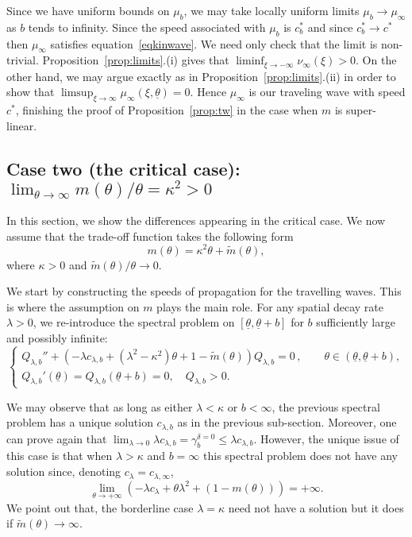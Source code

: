 \documentclass[11pt]{article}    %
\begin{document}
Since we have uniform bounds on $\mu_b$, we may take locally uniform limits $\mu_b \to \mu_\infty$ as $b$ tends to infinity.  Since the speed associated with $\mu_b$ is $c_b^*$ and since $c_b^* \to c^*$ then $\mu_\infty$ satisfies equation~\eqref{eqkinwave}.  We need only check that the limit is non-trivial.  Proposition~\ref{prop:limits}.(i) gives that $\liminf_{\xi\to-\infty} \nu_\infty(\xi) > 0$.  On the other hand, we may argue exactly as in Proposition~\ref{prop:limits}.(ii) in order to show that $\limsup_{\xi\to\infty} \mu_\infty(\xi,\underline\theta) = 0$.  Hence $\mu_\infty$ is our traveling wave with speed $c^*$, finishing the proof of Proposition~\ref{prop:tw} in the case when $m$ is super-linear.


\subsection{Case two (the critical case): $\lim_{\theta\to\infty} m(\theta)/\theta = \kappa^2 > 0$}

In this section, we show the differences appearing in the critical case. We now assume that the trade-off function takes the following form
\begin{equation*}
m(\theta) = \kappa^2 \theta + \widetilde m(\theta), 
\end{equation*}
where $\kappa > 0$ and $\widetilde m(\theta)/\theta \to 0$.

We start by constructing the speeds of propagation for the travelling waves. This is where the assumption on $m$ plays the main role. For any spatial decay rate $\lambda > 0$, we re-introduce the spectral problem on $[\underline\theta, \underline\theta + b]$ for $b$ sufficiently large and possibly infinite:
\begin{equation*}
\begin{cases} 
Q_{\lambda,b}''+ \left( - \lambda c_{\lambda,b} + \left( \lambda^2 - \kappa^2 \right) \theta  + 1 - \widetilde m(\theta)  \right) Q_{\lambda,b} = 0\,, \qquad \theta \in (\underline\theta, \underline\theta + b), \\
 Q_{\lambda,b} ' \left( \underline\theta \right)= Q_{\lambda,b}(\underline\theta + b) = 0, \quad Q_{\lambda,b} > 0.
\end{cases}
\end{equation*}

We may observe that as long as either $\lambda < \kappa$ or $b < \infty$, the previous spectral problem has a unique solution $c_{\lambda,b}$ as in the previous sub-section. Moreover, one can prove again that $\lim_{\lambda \to 0} \lambda c_{\lambda,b} = \gamma_b^{\delta=0} \leq \lambda c_{\lambda,b}$.  However, the unique issue of this case is that when $\lambda > \kappa$ and $b = \infty$ this spectral problem does not have any solution since, denoting $c_\lambda = c_{\lambda,\infty}$,
\begin{equation*}
\lim_{\theta \to + \infty} \left( - \lambda c_\lambda + \theta \lambda^2   + \left( 1 - m(\theta) \right) \right) = + \infty.
\end{equation*}
We point out that, the borderline case $\lambda = \kappa$ need not have a solution but it does if $\widetilde m(\theta) \to \infty$.
\end{document}
